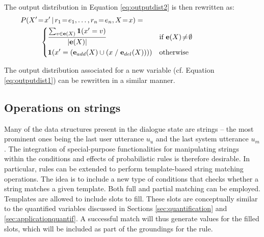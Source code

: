 The output distribution in Equation \eqref{eq:outputdist2} is then rewritten as:
\begin{align}
&P(X'\!=\!x' \, | \, r_1\!=\!e_1, \dots, r_n\!=\!e_n, X\!=\!x) = \hspace{5cm} \nonumber \\ & \; \; \; \; \; \; \; \; \; \;  \begin{dcases} 
\frac{\sum_{v \in {\mathbf{e}(X)}} \mathbf{1}(x' = v)} { |\mathbf{e}(X)| }  & \text{if } \mathbf{e}(X)\!\neq\!\emptyset \\
\mathbf{1}(x' = \left(\mathbf{e}_{add}(X) \cup \left(x \; / \; \mathbf{e}_{del}(X)\right)\right)) & \text{otherwise} \\
\end{dcases}\label{eq:outputdist4}
\end{align} 

The output distribution associated for a new variable (cf. Equation \eqref{eq:outputdist1}) can be rewritten in a similar manner.




\subsection{Operations on strings}

Many of the data structures present in the dialogue state are strings -- the most prominent ones being the last user utterance $u_u$ and the last system utterance $u_m$. The integration of special-purpose functionalities for manipulating strings within the conditions and effects of probabilistic rules is therefore desirable. In particular, rules can be extended to perform template-based string matching operations.  The idea is to include a new type of conditions that checks whether a string matches a given template.  Both full and partial matching can be employed. Templates are allowed to include slots to fill. These slots are conceptually similar to the quantified variables discussed in Sections \ref{sec:quantification} and \ref{sec:applicationquantif}. A successful match will thus generate values for the filled slots, which will be included as part of the groundings for the rule. 

